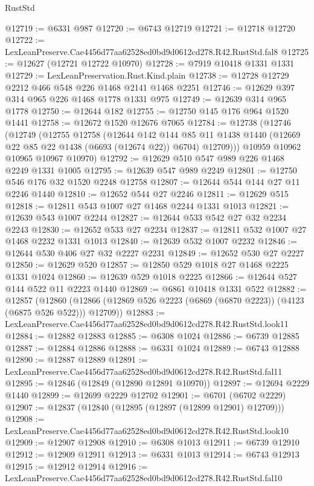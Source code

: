 \begin{lexlean}{RustStd}
\begin{coremodule}
@12719 := @6331 @987
@12720 := @6743 @12719
@12721 := @12718 @12720
@12722 := LexLeanPreserve.Cae4456d77aa62528ed0bd9d0612cd278.R42.RustStd.fal8
@12725 := @12627 (@12721 @12722 @10970)
@12728 := @7919 @10418 @1331 @1331
@12729 := LexLeanPreservation.Rust.Kind.plain
@12738 := @12728 @12729 @2212 @466 @548 @226 @1468 @2141 @1468 @2251
@12746 := @12629 @397 @314 @965 @226 @1468 @1778 @1331 @975
@12749 := @12639 @314 @965 @1778
@12750 := @12644 @182
@12755 := @12750 @145 @176 @964 @1520 @1441
@12758 := @12672 @1520 @12676 @7065
@12784 := @12738
    (@12746
      (@12749
        (@12755
          @12758
          (@12644
            @142
            @144
            @85
            @11
            @1438
            @1440
            (@12669 @22 @85 @22 @1438 (@6693 (@12674 @22)) @6704)
            @12709)))
      @10959
      @10962
      @10965
      @10967
      @10970)
@12792 := @12629 @510 @547 @989 @226 @1468 @2249 @1331 @1005
@12795 := @12639 @547 @989 @2249
@12801 := @12750 @546 @176 @32 @1520 @2248 @12758
@12807 := @12644 @544 @144 @27 @11 @2246 @1440
@12810 := @12652 @544 @27 @2246
@12811 := @12629 @515
@12818 := @12811 @543 @1007 @27 @1468 @2244 @1331 @1013
@12821 := @12639 @543 @1007 @2244
@12827 := @12644 @533 @542 @27 @32 @2234 @2243
@12830 := @12652 @533 @27 @2234
@12837 := @12811 @532 @1007 @27 @1468 @2232 @1331 @1013
@12840 := @12639 @532 @1007 @2232
@12846 := @12644 @530 @406 @27 @32 @2227 @2231
@12849 := @12652 @530 @27 @2227
@12850 := @12629 @520
@12857 := @12850 @529 @1018 @27 @1468 @2225 @1331 @1024
@12860 := @12639 @529 @1018 @2225
@12866 := @12644 @527 @144 @522 @11 @2223 @1440
@12869 := @6861 @10418 @1331 @522
@12882 := @12857
    (@12860 (@12866 (@12869 @526 @2223 (@6869 (@6870 @2223)) (@4123 (@6875 @526 @522))) @12709))
@12883 := LexLeanPreserve.Cae4456d77aa62528ed0bd9d0612cd278.R42.RustStd.look11
@12884 := @12882 @12883
@12885 := @6308 @1024
@12886 := @6739 @12885
@12887 := @12884 @12886
@12888 := @6331 @1024
@12889 := @6743 @12888
@12890 := @12887 @12889
@12891 := LexLeanPreserve.Cae4456d77aa62528ed0bd9d0612cd278.R42.RustStd.fal11
@12895 := @12846 (@12849 (@12890 @12891 @10970))
@12897 := @12694 @2229 @1440
@12899 := @12699 @2229 @12702
@12901 := @6701 (@6702 @2229)
@12907 := @12837 (@12840 (@12895 (@12897 (@12899 @12901) @12709)))
@12908 := LexLeanPreserve.Cae4456d77aa62528ed0bd9d0612cd278.R42.RustStd.look10
@12909 := @12907 @12908
@12910 := @6308 @1013
@12911 := @6739 @12910
@12912 := @12909 @12911
@12913 := @6331 @1013
@12914 := @6743 @12913
@12915 := @12912 @12914
@12916 := LexLeanPreserve.Cae4456d77aa62528ed0bd9d0612cd278.R42.RustStd.fal10

\end{coremodule}
\end{lexlean}
